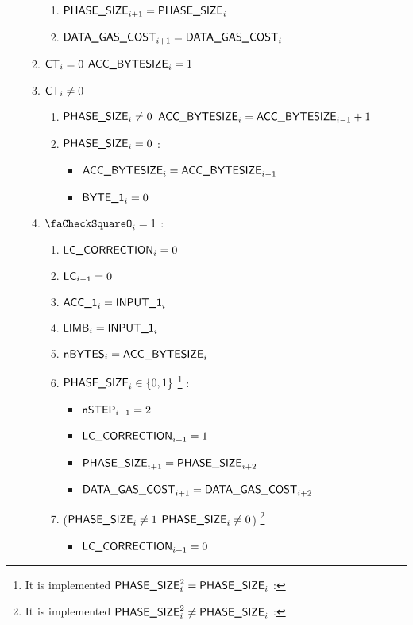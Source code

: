\begin{enumerate}[resume]
\begin{enumerate}
\begin{enumerate}
                \item $\textsf{PHASE\_SIZE}_{i + 1} = \textsf{PHASE\_SIZE}_{i}$
                \item $\textsf{DATA\_GAS\_COST}_{i + 1} = \textsf{DATA\_GAS\_COST}_{i}$
            \end{enumerate}
            \item \If $\textsf{CT}_{i}=0$ \Then $\textsf{ACC\_BYTESIZE}_{i}= 1$
            \item \If $\textsf{CT}_{i} \ne 0$ \Then
            \begin{enumerate}
                \item \If $\textsf{PHASE\_SIZE}_{i} \ne 0$ \Then $\textsf{ACC\_BYTESIZE}_{i}=\textsf{ACC\_BYTESIZE}_{i-1}+1$
                \item \If $\textsf{PHASE\_SIZE}_{i}=0$ \Then:
                \begin{itemize}
                    \item $\textsf{ACC\_BYTESIZE}_{i}=\textsf{ACC\_BYTESIZE}_{i-1}$
                    \item $\textsf{BYTE}\textsf{\_1}_{i}=0$
                \end{itemize}
            \end{enumerate}
            \item \If $\done_{i}=1$ \Then:
            \begin{enumerate}
                \item $\textsf{LC\_CORRECTION}_{i}=0$
                \item $\textsf{LC}_{i-1}=0$
                \item $\textsf{ACC}\textsf{\_1}_{i} = \textsf{INPUT\_1}_{i}$
                \item $\textsf{LIMB}_{i} = \textsf{INPUT\_1}_{i}$
                \item $\textsf{nBYTES}_{i}=\textsf{ACC\_BYTESIZE}_{i}$
                \item \If $\textsf{PHASE\_SIZE}_{i} \in \{0, 1\}$ \footnote{It is implemented \If $\textsf{PHASE\_SIZE}_{i}^{2} = \textsf{PHASE\_SIZE}_{i}$ \Then:} \Then:
                \begin{itemize}
                    \item $\textsf{nSTEP}_{i+1}=2$
                    \item  $\textsf{LC\_CORRECTION}_{i+1} = 1$
                    \item $\textsf{PHASE\_SIZE}_{i + 1} = \textsf{PHASE\_SIZE}_{i+2}$
                    \item $\textsf{DATA\_GAS\_COST}_{i + 1} = \textsf{DATA\_GAS\_COST}_{i+2}$
                \end{itemize}
                \item \If ($\textsf{PHASE\_SIZE}_{i} \ne 1$ \et $\textsf{PHASE\_SIZE}_{i} \ne 0$) \footnote{It is implemented \If $\textsf{PHASE\_SIZE}_{i}^{2} \ne \textsf{PHASE\_SIZE}_{i}$ \Then:} \Then 
                \begin{itemize}
                    \item $\textsf{LC\_CORRECTION}_{i+1} = 0$
                \end{itemize}
            \end{enumerate}
        \end{enumerate}        
\end{enumerate}
